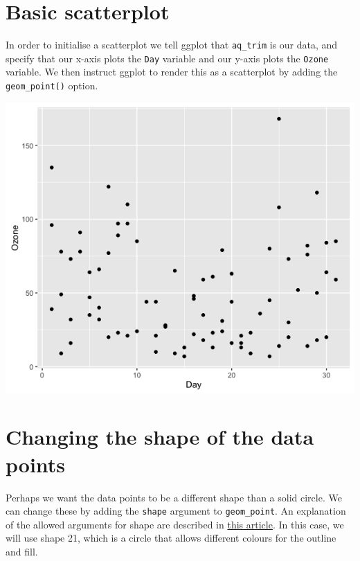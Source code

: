 \section{Basic scatterplot}\label{basic-scatterplot}

In order to initialise a scatterplot we tell ggplot that
\texttt{aq\_trim} is our data, and specify that our x-axis plots the
\texttt{Day} variable and our y-axis plots the \texttt{Ozone} variable.
We then instruct ggplot to render this as a scatterplot by adding the
\texttt{geom\_point()} option.

\begin{Shaded}
\begin{Highlighting}[]
\StringTok{ }\NormalTok{(}  \StringTok{ }
\StringTok{      }\NormalTok{()}
\end{Highlighting}
\end{Shaded}

\begin{center}\includegraphics[width=0.55\linewidth]{0_all_posts_pdf/scatter_1-1} \end{center}

\section{Changing the shape of the data
points}\label{changing-the-shape-of-the-data-points}

Perhaps we want the data points to be a different shape than a solid
circle. We can change these by adding the \texttt{shape} argument to
\texttt{geom\_point}. An explanation of the allowed arguments for shape
are described in
\href{http://sape.inf.usi.ch/quick-reference/ggplot2/shape}{this
article}. In this case, we will use shape 21, which is a circle that
allows different colours for the outline and fill.

